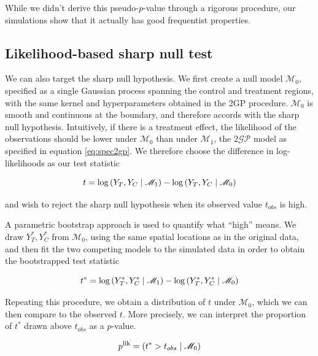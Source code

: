 \documentclass[letter]{article}
\newcommand{\genericdel}[3]{%
      \left#1#3\right#2
    }
\newcommand{\del}[1]{\genericdel(){#1}}
\let\Pr\relax
\DeclareMathOperator{\Pr}{\mathbb{P}}
\newcommand{\gp}{\mathcal{GP}}
\newcommand{\modnull}{\mathscr{M}_0}
\newcommand{\modalt}{\mathscr{M}_1}
\begin{document}
While we didn't derive this pseudo-\(p\)-value through a rigorous
procedure, our simulations show that it actually has good frequentist
properties.
    


    	\subsection{Likelihood-based sharp null
test}\label{likelihood-based-sharp-null-test}

We can also target the sharp null hypothesis. We first create a null
model \(\modnull\), specified as a single Gaussian process spanning the
control and treatment regions, with the same kernel and hyperparameters
obtained in the 2GP procedure. \(\modnull\) is smooth and continuous at
the boundary, and therefore accords with the sharp null hypothesis.
Intuitively, if there is a treatment effect, the likelihood of the
observations should be lower under \(\modnull\) than under \(\modalt\),
the 2\(\gp\) model as specified in equation \eqref{eq:spec2gp}. We
therefore choose the difference in log-likelihoods as our test statistic

\begin{equation}
    t = \log \Pr\del{Y_T, Y_C \mid \modalt} - \log \Pr\del{Y_T, Y_C \mid \modnull}
\end{equation}

and wish to reject the sharp null hypothesis when its observed value
\(t_{obs}\) is high.

A parametric bootstrap approach is used to quantify what ``high'' means.
We draw \(Y_T^*,Y_C^*\) from \(\modnull\), using the same spatial
locations as in the original data, and then fit the two competing models
to the simulated data in order to obtain the bootstrapped test statistic

\begin{equation}
    t^* = \log \Pr\del{Y_T^*, Y_C^* \mid \modalt} - \log \Pr\del{Y_T^*, Y_C^* \mid \modnull}
\end{equation}

Repeating this procedure, we obtain a distribution of \(t\) under
\(\modnull\), which we can then compare to the observed \(t\). More
precisely, we can interpret the proportion of \(t^*\) drawn above
\(t_{obs}\) as a \(p\)-value.

\begin{equation}
    p^{\mathrm{lik}} = \Pr\del{t^* > t_{obs} \mid \modnull}
\end{equation}
\end{document}
